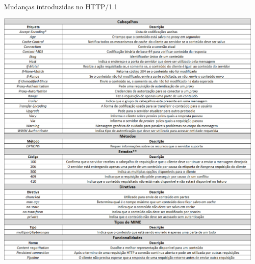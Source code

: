 \begin{quadro}[H]
	\caption{Mudanças introduzidas no HTTP/1.1}
	\centering
	\includegraphics[width=1.0\textwidth]{./04-figuras/fund-teorica/http11novo}
	\label{qua:http11novo}
\end{quadro}
